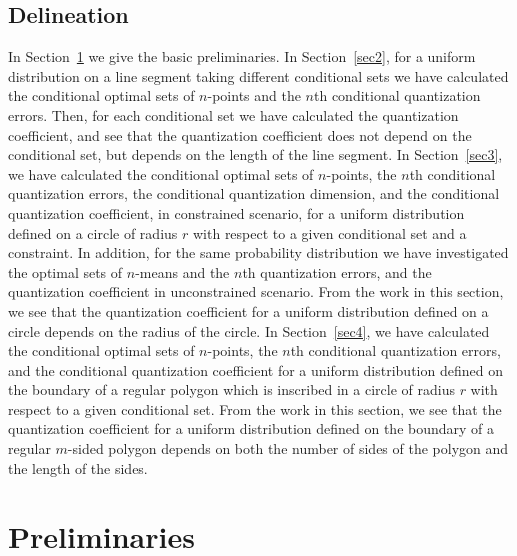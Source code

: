 \documentclass[12pt, reqno]{amsart}
\theoremstyle{plain}
\theoremstyle{definition}
\begin{document}
\subsection*{Delineation} 
In Section~\ref{sec1} we give the basic preliminaries. In Section~\ref{sec2}, for a uniform distribution on a line segment taking different conditional sets we have calculated the conditional optimal sets of $n$-points and the $n$th conditional quantization errors. Then, for each conditional set we have calculated the quantization coefficient, and see that the quantization coefficient does not depend on the conditional set, but depends on the length of the line segment. In Section~\ref{sec3}, we have calculated the conditional optimal sets of $n$-points, the $n$th conditional quantization errors, the conditional quantization dimension, and the conditional quantization coefficient, in constrained scenario, for a uniform distribution defined on a circle of radius $r$ with respect to a given conditional set and a constraint. In addition, for the same probability distribution we have investigated the optimal sets of $n$-means and the $n$th quantization errors, and the quantization coefficient in unconstrained scenario. From the work in this section, we see that the quantization coefficient for a uniform distribution defined on a circle depends on the radius of the circle. In Section~\ref{sec4}, we have calculated the conditional optimal sets of $n$-points, the $n$th conditional quantization errors, and the conditional quantization coefficient for a uniform distribution defined on the boundary of a regular polygon which is inscribed in a circle of radius $r$ with respect to a given conditional set. From the work in this section, we see that the quantization coefficient for a uniform distribution defined on the boundary of a regular $m$-sided polygon depends on both the number of sides of the polygon and the length of the sides.   


\section{Preliminaries} \label{sec1} 
\end{document}
